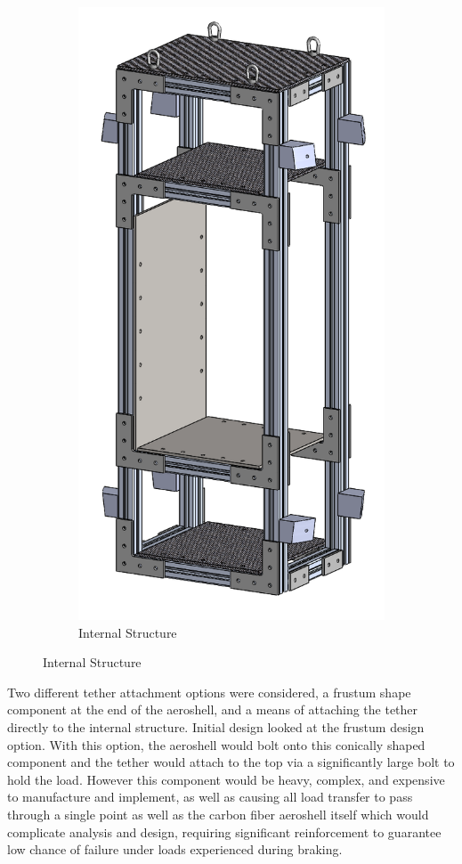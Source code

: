 \begin{figure}[H]
\begin{subfigure}[b]{.3\textwidth}
  \centering
  \includegraphics[width=0.8\linewidth]{Aeroshell/StructNoshell.png}
  \caption{\label{fig:structnoshell} Internal Structure}
\end{subfigure}
\end{figure}

\indent\indent Two different tether attachment options were considered, a frustum shape component at the end of the aeroshell, and a means of attaching the tether directly to the internal structure. Initial design looked at the frustum design option. With this option, the aeroshell would bolt onto this conically shaped component and the tether would attach to the top via a significantly large bolt to hold the load. However this component would be heavy, complex, and expensive to manufacture and implement, as well as causing all load transfer to pass through a single point as well as the carbon fiber aeroshell itself which would complicate analysis and design, requiring significant reinforcement to guarantee low chance of failure under loads experienced during braking.

